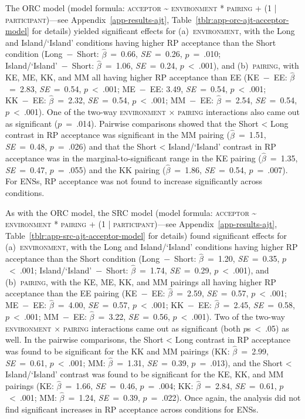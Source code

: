 The ORC model (model formula: \textsc{acceptor \~{} environment * pairing + (1 | participant)}---see Appendix~\ref{app-results-ajt}, Table~\ref{tblr:app-orc-ajt-acceptor-model} for details) yielded significant effects for (a)~\textsc{environment}, with the Long and Island/`Island' conditions having higher RP acceptance than the Short condition (Long~−~Short: $\hat{\beta}$~=~0.66, \textit{SE}~=~0.26, $p$~=~.010; Island/`Island'~−~Short: $\hat{\beta}$~=~1.06, \textit{SE}~=~0.24, $p$~<~.001), and (b)~\textsc{pairing}, with KE, ME, KK, and MM all having higher RP acceptance than EE (KE~−~EE: $\hat{\beta}$~=~2.83, \textit{SE}~=~0.54, $p$~<~.001; ME~−~EE: 3.49, \textit{SE}~=~0.54, $p$~<~.001; KK~−~EE: $\hat{\beta}$~=~2.32, \textit{SE}~=~0.54, $p$~<~.001; MM~−~EE: $\hat{\beta}$~=~2.54, \textit{SE}~=~0.54, $p$~<~.001). One of the two-way \textsc{environment} × \textsc{pairing} interactions also came out as significant ($p$~=~.014). Pairwise comparisons showed that the Short < Long contrast in RP acceptance was significant in the MM pairing ($\hat{\beta}$~=~1.51, \textit{SE}~=~0.48, $p$~=~.026) and that the Short < Island/`Island' contrast in RP acceptance was in the marginal-to-significant range in the KE pairing ($\hat{\beta}$~=~1.35, \textit{SE}~=~0.47, $p$~=~.055) and the KK pairing ($\hat{\beta}$~=~1.86, \textit{SE}~=~0.54, $p$~=~.007). For ENSs, RP acceptance was not found to increase significantly across conditions.

As with the ORC model, the SRC model (model formula: \textsc{acceptor \~{} environment * pairing + (1 | participant)}---see Appendix~\ref{app-results-ajt}, Table~\ref{tblr:app-src-ajt-acceptor-model} for details) found significant effects for (a)~\textsc{environment}, with the Long and Island/`Island' conditions having higher RP acceptance than the Short condition (Long~−~Short: $\hat{\beta}$~=~1.20, \textit{SE}~=~0.35, $p$~<~.001; Island/`Island'~−~Short: $\hat{\beta}$~=~1.74, \textit{SE}~=~0.29, $p$~<~.001), and (b)~\textsc{pairing}, with the KE, ME, KK, and MM pairings all having higher RP acceptance than the EE pairing (KE~−~EE: $\hat{\beta}$~=~2.59, \textit{SE}~=~0.57, $p$~<~.001; ME~−~EE: $\hat{\beta}$~=~4.00, \textit{SE}~=~0.57, $p$~<~.001; KK~−~EE: $\hat{\beta}$~=~2.45, \textit{SE}~=~0.58, $p$~<~.001; MM~−~EE: $\hat{\beta}$~=~3.22, \textit{SE}~=~0.56, $p$~<~.001). Two of the two-way \textsc{environment} × \textsc{pairing} interactions came out as significant (both $p$s~<~.05) as well. In the pairwise comparisons, the Short < Long contrast in RP acceptance was found to be significant for the KK and MM pairings (KK: $\hat{\beta}$~=~2.99, \textit{SE}~=~0.61, $p$~<~.001; MM: $\hat{\beta}$~=~1.31, \textit{SE}~=~0.39, $p$~=~.013), and the Short < Island/`Island' contrast was found to be significant for the KE, KK, and MM pairings (KE: $\hat{\beta}$~=~1.66, \textit{SE}~=~0.46, $p$~=~.004; KK: $\hat{\beta}$~=~2.84, \textit{SE}~=~0.61, $p$~<~.001; MM: $\hat{\beta}$~=~1.24, \textit{SE}~=~0.39, $p$~=~.022). Once again, the analysis did not find significant increases in RP acceptance across conditions for ENSs.

